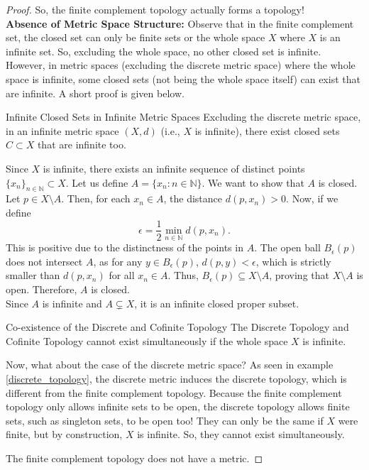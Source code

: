 \begin{proof}
    So, the finite complement topology actually forms a topology!\\
    \textbf{Absence of Metric Space Structure:} Observe that in the finite complement set, the closed set can only be finite sets or the whole space $X$ where $X$ is an infinite set. So, excluding the whole space, no other closed set is infinite.\\
    However, in metric spaces (excluding the discrete metric space) where the whole space is infinite, some closed sets (not being the whole space itself) can exist that are infinite. A short proof is given below.\\
    \begin{Lemma}{Infinite Closed Sets in Infinite Metric Spaces}\label{infinite_closed_sets_metric_spaces}
        Excluding the discrete metric space, in an infinite metric space $(X,d)$ (i.e., $X$ is infinite), there exist closed sets $C\subset X$ that are infinite too.
    \end{Lemma}
    \begin{lemma_proof}
            Since \(X\) is infinite, there exists an infinite sequence of distinct points \(\{x_n\}_{n \in \mathbb{N}} \subset X\). Let us define \(A = \{x_n: n \in \mathbb{N}\}\). We want to show that \(A\) is closed. Let \(p \in X \setminus A\). Then, for each \(x_n \in A\), the distance \(d(p, x_n) > 0\). Now, if we define
            \[\epsilon = \frac{1}{2} \min_{n \in \mathbb{N}} d(p, x_n).\]
            This is positive due to the distinctness of the points in \(A\). The open ball \(B_{\epsilon}(p)\) does not intersect \(A\), as for any \(y \in B_{\epsilon}(p)\), \(d(p, y) < \epsilon\), which is strictly smaller than \(d(p, x_n)\) for all \(x_n \in A\). Thus, \(B_{\epsilon}(p) \subseteq X \setminus A\), proving that \(X \setminus A\) is open. Therefore, \(A\) is closed.\\
            Since \(A\) is infinite and \(A \subsetneq X\), it is an infinite closed proper subset.
    \end{lemma_proof}
    \begin{Lemma}{Co-existence of the Discrete and Cofinite Topology}\label{discrete_cofinite_simultaneous}
        The Discrete Topology and Cofinite Topology cannot exist simultaneously if the whole space $X$ is infinite.
    \end{Lemma}
    \begin{lemma_proof}
            Now, what about the case of the discrete metric space? As seen in example \eqref{discrete_topology}, the discrete metric induces the discrete topology, which is different from the finite complement topology. Because the finite complement topology only allows infinite sets to be open, the discrete topology allows finite sets, such as singleton sets, to be open too! They can only be the same if $X$ were finite, but by construction, $X$ is infinite. So, they cannot exist simultaneously.
    \end{lemma_proof}
    \noindent The finite complement topology does not have a metric.
\end{proof}
